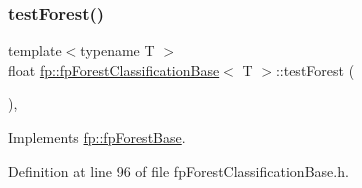 \subsubsection{\texorpdfstring{test\+Forest()}{testForest()}}
{\footnotesize\ttfamily template$<$typename T $>$ \\
float \hyperlink{classfp_1_1fpForestClassificationBase}{fp\+::fp\+Forest\+Classification\+Base}$<$ T $>$\+::test\+Forest (\begin{DoxyParamCaption}{ }\end{DoxyParamCaption})\hspace{0.3cm}{\ttfamily [inline]}, {\ttfamily [virtual]}}



Implements \hyperlink{classfp_1_1fpForestBase_af7becba028a198f650841b718d16ed16}{fp\+::fp\+Forest\+Base}.



Definition at line 96 of file fp\+Forest\+Classification\+Base.\+h.


